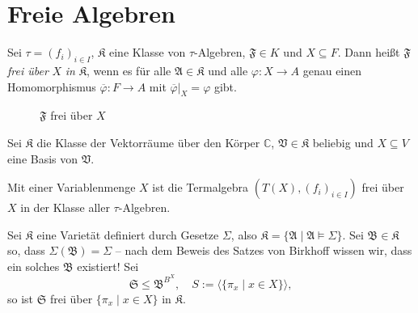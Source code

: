 \section{Freie Algebren}

\begin{definition}
Sei $ \tau = (f_i)_{i \in I}$, $\mathfrak{K}$ eine Klasse von $\tau$-Algebren, $\mathfrak{F} \in K$ und $X \subseteq F$. Dann heißt $\mathfrak{F}$ \emph{frei über} $X$ \emph{in} $\mathfrak{K}$, wenn es für alle $\mathfrak{A} \in \mathfrak{K}$ und alle $\varphi : X \to A$ genau einen Homomorphismus $\overline{\varphi} : F \to A$ mit $\overline{\varphi} \vert_X = \varphi$ gibt.

\begin{figure}[H]
    \centering
    \caption{$\mathfrak{F}$ frei über $X$}
\end{figure}
\end{definition}

\begin{example}
    Sei $\mathfrak{K}$ die Klasse der Vektorräume über den Körper $\mathbb{C}$, $\mathfrak{V} \in \mathfrak{K}$ beliebig und $X \subseteq V$ eine Basis von $\mathfrak{V}$.

    Mit einer Variablenmenge $X$ ist die Termalgebra $(T(X), (f_i)_{i \in I})$ frei über $X$ in der Klasse aller $\tau$-Algebren.
\end{example}

\begin{example}
    Sei $\mathfrak{K}$ eine Varietät definiert durch Gesetze $\Sigma$, also $\mathfrak{K} = \{ \mathfrak{A} \mid \mathfrak{A} \models \Sigma \}$. Sei $\mathfrak{B} \in \mathfrak{K}$ so, dass $\Sigma(\mathfrak{B}) = \Sigma$ -- nach dem Beweis des Satzes von Birkhoff wissen wir, dass ein solches $\mathfrak{B}$ existiert! Sei
    $$ \mathfrak{S} \leq \mathfrak{B}^{B^X}, \quad S := \langle \{ \pi_x \mid x \in X \} \rangle, $$
    so ist $\mathfrak{S}$ frei über $\{ \pi_x \mid x \in X \}$ in $\mathfrak{K}$.
\end{example}

